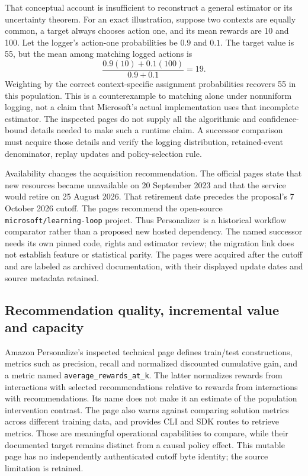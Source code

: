 That conceptual account is insufficient to reconstruct a general estimator
or its uncertainty theorem. For an exact illustration, suppose two contexts
are equally common, a target always chooses action one, and its mean rewards
are 10 and 100. Let the logger's action-one probabilities be $0.9$ and $0.1$.
The target value is 55, but the mean among matching logged actions is
\[
 \frac{0.9(10)+0.1(100)}{0.9+0.1}=19.
\]
Weighting by the correct context-specific assignment probabilities recovers
55 in this population. This is a counterexample to matching alone under
nonuniform logging, not a claim that Microsoft's actual implementation uses
that incomplete estimator. The inspected pages do not supply all the
algorithmic and confidence-bound details needed to make such a runtime
claim. A successor comparison must acquire those details and verify the
logging distribution, retained-event denominator, replay updates and
policy-selection rule. \citep{exec16_cp_azure,exec16_cp_exact}

Availability changes the acquisition recommendation. The official pages state
that new resources became unavailable on 20 September 2023 and that the service
would retire on 25 August 2026. That retirement date precedes the proposal's
7 October 2026 cutoff. The pages recommend the open-source
\texttt{microsoft/learning-loop} project. Thus Personalizer is a historical
workflow comparator rather than a proposed new hosted dependency. The named
successor needs its own pinned code, rights and estimator review; the migration
link does not establish feature or statistical parity. The pages were acquired
after the cutoff and are labeled as archived documentation, with their
displayed update dates and source metadata retained. \citep{exec16_cp_azure}

\subsection{Recommendation quality, incremental value and capacity}

Amazon Personalize's inspected technical page defines train/test constructions,
metrics such as precision, recall and normalized discounted cumulative gain,
and a metric named \texttt{average\_rewards\_at\_k}. The latter normalizes
rewards from interactions with selected recommendations relative to rewards
from interactions with recommendations. Its name does not make it an estimate
of the population intervention contrast. The page also warns against comparing
solution metrics across different training data, and provides CLI and SDK
routes to retrieve metrics. Those are meaningful operational capabilities to
compare, while their documented target remains distinct from a causal policy
effect. This mutable page has no independently authenticated cutoff byte
identity; the source limitation is retained. \citep{exec16_cp_aws}

